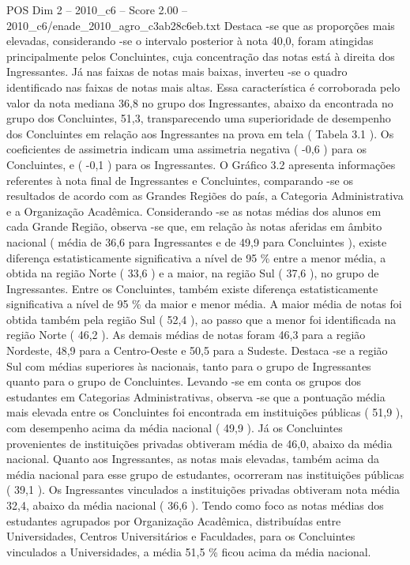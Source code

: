 \begin{textsample}{POS Dim 2 – 2010\_c6 – Score 2.00 – 2010\_c6/enade\_2010\_agro\_c3ab28c6eb.txt}
Destaca -se que as proporções mais elevadas, considerando -se o intervalo posterior à nota 40,0, foram atingidas principalmente pelos Concluintes, cuja concentração das notas está à direita dos Ingressantes.
Já nas faixas de notas mais baixas, inverteu -se o quadro identificado nas faixas de notas mais altas.
Essa característica é corroborada pelo valor da nota mediana 36,8 no grupo dos Ingressantes, abaixo da encontrada no grupo dos Concluintes, 51,3, transparecendo uma superioridade de desempenho dos Concluintes em relação aos Ingressantes na prova em tela ( Tabela 3.1 ).
Os coeficientes de assimetria indicam uma assimetria negativa ( -0,6 ) para os Concluintes, e ( -0,1 ) para os Ingressantes.
O Gráfico 3.2 apresenta informações referentes à nota final de Ingressantes e Concluintes, comparando -se os resultados de acordo com as Grandes Regiões do país, a Categoria Administrativa e a Organização Acadêmica.
Considerando -se as notas médias dos alunos em cada Grande Região, observa -se que, em relação às notas aferidas em âmbito nacional ( média de 36,6 para Ingressantes e de 49,9 para Concluintes ), existe diferença estatisticamente significativa a nível de 95 \% entre a menor média, a obtida na região Norte ( 33,6 ) e a maior, na região Sul ( 37,6 ), no grupo de Ingressantes.
Entre os Concluintes, também existe diferença estatisticamente significativa a nível de 95 \% da maior e menor média.
A maior média de notas foi obtida também pela região Sul ( 52,4 ), ao passo que a menor foi identificada na região Norte ( 46,2 ).
As demais médias de notas foram 46,3 para a região Nordeste, 48,9 para a Centro-Oeste e 50,5 para a Sudeste.
Destaca -se a região Sul com médias superiores às nacionais, tanto para o grupo de Ingressantes quanto para o grupo de Concluintes.
Levando -se em conta os grupos dos estudantes em Categorias Administrativas, observa -se que a pontuação média mais elevada entre os Concluintes foi encontrada em instituições públicas ( 51,9 ), com desempenho acima da média nacional ( 49,9 ).
Já os Concluintes provenientes de instituições privadas obtiveram média de 46,0, abaixo da média nacional.
Quanto aos Ingressantes, as notas mais elevadas, também acima da média nacional para esse grupo de estudantes, ocorreram nas instituições públicas ( 39,1 ).
Os Ingressantes vinculados a instituições privadas obtiveram nota média 32,4, abaixo da média nacional ( 36,6 ).
Tendo como foco as notas médias dos estudantes agrupados por Organização Acadêmica, distribuídas entre Universidades, Centros Universitários e Faculdades, para os Concluintes vinculados a Universidades, a média 51,5 \% ficou acima da média nacional.

\end{textsample}
